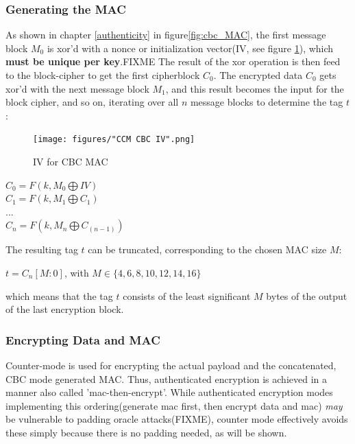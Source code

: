 \subsubsection{Generating the MAC}

As shown in chapter \ref{authenticity} in figure\ref{fig:cbc_MAC}, the first message block $M_0$ is xor'd with a nonce or initialization vector(IV, see figure
\ref{fig:ccrMacIV}), which \textbf{must be unique per key}.FIXME
The result of the xor operation is then feed to the block-cipher to get the first cipherblock $C_0$. The encrypted data $C_0$ gets xor'd with the next message block $M_1$, and this
result becomes the input for the block cipher, and so on, iterating over all $n$ message blocks to determine the tag $t$:

\begin{figure}
    \centering
    \texttt{[image: figures/"CCM CBC IV".png]}
    \caption{IV for CBC MAC}
    \label{fig:ccrMacIV}
\end{figure}


\begin{center}
 $C_0 = F(k, M_0 \bigoplus IV )$
 \\
 $C_1 = F(k, M_1 \bigoplus C_1) $
 \\
 $...$
 \\
 $C_n = F(k, M_n \bigoplus C_{(n-1)})$
 \\
\end{center}

The resulting tag $t$ can be truncated, corresponding to the chosen MAC size $M$:
\begin{center}
  $t = C_n[M:0]$, with $M \in \{4, 6, 8, 10, 12, 14, 16\}$
\end{center}
which means that the tag $t$ consists of the least significant $M$ bytes of the output of the last encryption block.

\subsubsection{Encrypting Data and MAC}

Counter-mode is used for encrypting the actual payload and the concatenated, CBC mode generated MAC.
Thus, authenticated encryption is achieved in a manner also called 'mac-then-encrypt'. While authenticated
encryption modes implementing this ordering(generate mac first, then encrypt data and mac) \textit{may}
be vulnerable to padding oracle attacks(FIXME), counter mode effectively avoids these simply because
there is no padding needed, as will be shown.

